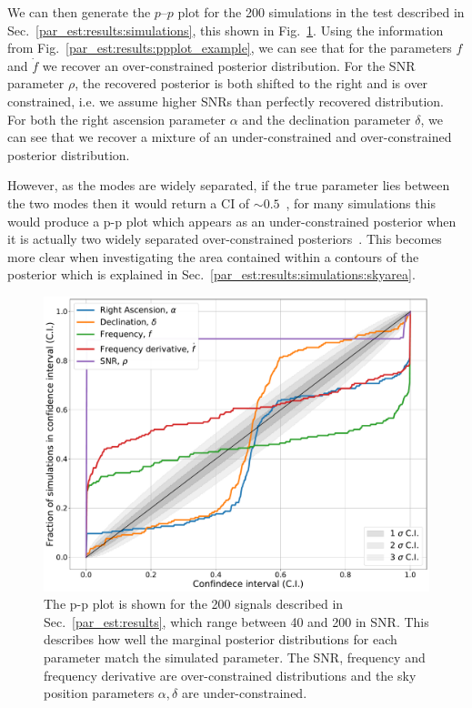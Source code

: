 We can then generate the $p$--$p$ plot for the 200 simulations in the test described in Sec.~\ref{par_est:results:simulations}, this shown
in Fig.~\ref{par_est:results:ppplot}.  Using the information from Fig.~\ref{par_est:results:ppplot_example}, we can see that for the parameters $f$
and $\dot{f}$ we recover an over-constrained posterior
distribution.  For the \gls{SNR} parameter $\rho$, the recovered posterior is
both shifted to the right and is over constrained, i.e. we assume higher
\glspl{SNR} than perfectly recovered distribution.  For both the right
ascension parameter $\alpha$ and the declination parameter $\delta$, we can see
that we recover a mixture of an under-constrained and over-constrained posterior distribution.  

However, as the modes are widely separated, if the true parameter lies between the two modes
then it would return a \gls{CI} of $\sim 0.5$~, for many simulations this
would produce a p-p plot which appears as an under-constrained posterior when
it is actually two widely separated over-constrained posteriors~. This becomes more clear when
investigating the area contained within a contours of the posterior which is
explained in Sec.~\ref{par_est:results:simulations:skyarea}.
%
\begin{figure}[ht]
    \centering
    \includegraphics[width=\linewidth]{C5_parameter/ppplot.pdf}
    \caption[p-p plot for the CW simulations]{The p-p plot is shown for the 200
signals described in Sec.~\ref{par_est:results}, which range between 40 and 200
in \gls{SNR}. This describes how well the marginal posterior distributions for
each parameter match the simulated parameter. The \gls{SNR}, frequency and
frequency derivative are over-constrained distributions and the sky position parameters
$\alpha,\delta$ are under-constrained.} \label{par_est:results:ppplot}
\end{figure}

